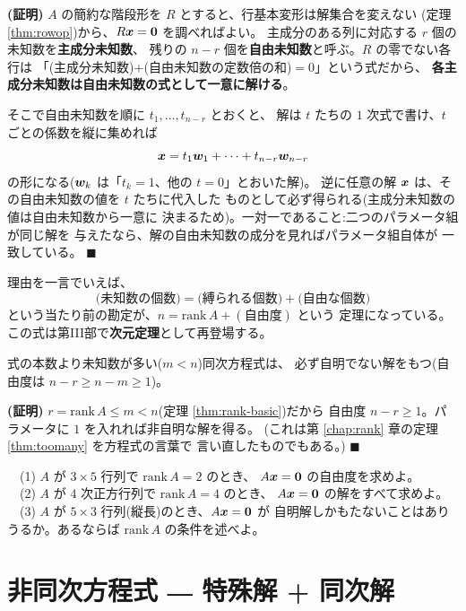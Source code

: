 \noindent\textbf{(証明)}\quad
$A$ の簡約な階段形を $R$ とすると、行基本変形は解集合を変えない
(定理 \ref{thm:rowop})から、$R\bm{x} = \bm{0}$ を調べればよい。
主成分のある列に対応する $r$ 個の未知数を\textbf{主成分未知数}、
残りの $n - r$ 個を\textbf{自由未知数}と呼ぶ。$R$ の零でない各行は
「(主成分未知数)$+$(自由未知数の定数倍の和)$= 0$」という式だから、
\textbf{各主成分未知数は自由未知数の式として一意に解ける}。

そこで自由未知数を順に $t_1, \dots, t_{n-r}$ とおくと、
解は $t$ たちの $1$ 次式で書け、$t$ ごとの係数を縦に集めれば
\[
\bm{x} = t_1 \bm{w}_1 + \cdots + t_{n-r}\bm{w}_{n-r}
\]
の形になる($\bm{w}_k$ は「$t_k = 1$、他の $t = 0$」とおいた解)。
逆に任意の解 $\bm{x}$ は、その自由未知数の値を $t$ たちに代入した
ものとして必ず得られる(主成分未知数の値は自由未知数から一意に
決まるため)。一対一であること:二つのパラメータ組が同じ解を
与えたなら、解の自由未知数の成分を見ればパラメータ組自体が
一致している。 $\blacksquare$

理由を一言でいえば、
\[
\text{(未知数の個数)} = \text{(縛られる個数)} + \text{(自由な個数)}
\]
という当たり前の勘定が、$n = \mathrm{rank}\,A + (\text{自由度})$ という
定理になっている。この式は第III部で\textbf{次元定理}として再登場する。

\begin{teiri}[系:横長の同次方程式]\label{thm:wide-homog}
式の本数より未知数が多い($m < n$)同次方程式は、
必ず自明でない解をもつ(自由度は $n - r \ge n - m \ge 1$)。
\end{teiri}

\noindent\textbf{(証明)}\quad
$r = \mathrm{rank}\,A \le m < n$(定理 \ref{thm:rank-basic})だから
自由度 $n - r \ge 1$。パラメータに $1$ を入れれば非自明な解を得る。
(これは第 \ref{chap:rank} 章の定理 \ref{thm:toomany} を方程式の言葉で
言い直したものでもある。) $\blacksquare$

\begin{mondai}\label{q:sol-freedom}
　(1) $A$ が $3 \times 5$ 行列で $\mathrm{rank}\,A = 2$ のとき、
$A\bm{x} = \bm{0}$ の自由度を求めよ。\\
　(2) $A$ が $4$ 次正方行列で $\mathrm{rank}\,A = 4$ のとき、
$A\bm{x} = \bm{0}$ の解をすべて求めよ。\\
　(3) $A$ が $5 \times 3$ 行列(縦長)のとき、$A\bm{x} = \bm{0}$ が
自明解しかもたないことはありうるか。あるならば
$\mathrm{rank}\,A$ の条件を述べよ。
\end{mondai}

\section{非同次方程式 ― 特殊解 + 同次解}

